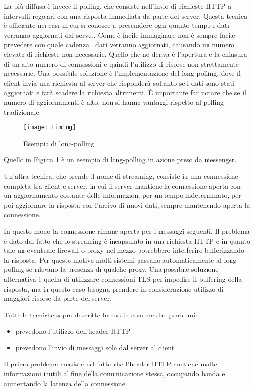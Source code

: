 La più diffusa è invece il polling, che consiste nell'invio di richieste HTTP a intervalli regolari con una risposta immediata da parte del server. 
Questa tecnica è efficiente nei casi in cui si conosce a prescindere ogni quanto tempo i dati verranno aggiornati dal server.
Come è facile immaginare non è sempre facile prevedere con quale cadenza i dati verranno aggiornati, causando un numero elevato di richieste non necessarie.
Quello che ne deriva è l'apertura e la chiusura di un alto numero di connessioni e quindi l'utilizzo di risorse non strettamente necessarie.
Una possibile soluzione è l'implementazione del long-polling, dove il client invia una richiesta al server che risponderà soltanto se i dati sono stati aggiornati e farà scadere la richiesta altrimenti. È importante far notare che se il numero di aggiornamenti è alto, non si hanno vantaggi rispetto al polling tradizionale.
\begin{figure}[htpb!]
  \centering
  \texttt{[image: timing]}
  \caption{Esempio di long-polling}
  \label{fig:timing}
\end{figure}
Quello in Figura \ref{fig:timing} è un esempio di long-polling in azione preso da messenger. 

Un'altra tecnica, che prende il nome di streaming, consiste in una connessione completa tra client e server, in cui il server mantiene la connessione aperta con un aggiornamento costante delle informazioni per un tempo indeterminato, per poi aggiornare la risposta con l'arrivo di nuovi dati, sempre mantenendo aperta la connessione.

In questo modo la connessione rimane aperta per i messaggi seguenti.
Il problema è dato dal fatto che lo streaming è incapsulato in una richiesta HTTP e in quanto tale un eventuale firewall o proxy nel mezzo potrebbero interferire bufferizzando la risposta.
Per questo motivo molti sistemi passano automaticamente al long-polling se rilevano la presenza di qualche proxy.
Una possibile soluzione alternativa è quella di utilizzare connessioni TLS per impedire il buffering della risposta,
ma in questo caso bisogna prendere in considerazione utilizzo di
maggiori risorse da parte del server.

Tutte le tecniche sopra descritte hanno in comune due problemi:
\begin{itemize}
\item prevedono l'utilizzo dell'header HTTP
\item prevedono l'invio di messaggi solo dal server al client
\end{itemize}
Il primo problema consiste nel fatto che l'header HTTP contiene molte informazioni inutili al fine della comunicazione stessa, occupando banda e aumentando la latenza della connessione.

